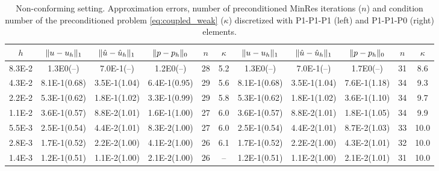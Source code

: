 \documentclass[r]{siamart171218}
\begin{document}
\begin{table}
  \begin{center}
    \scriptsize{
  \begin{tabular}{c|ccc|c|c||ccc|c|c}
    \hline
    $h$ & $\lVert{u-u_h}\rVert_1$ & $\lVert{\hat{u}-\hat{u}_h}\rVert_1$ & $\lVert{p-p_h}\rVert_0$ & $n$ & $\kappa$
        & $\lVert{u-u_h}\rVert_1$ & $\lVert{\hat{u}-\hat{u}_h}\rVert_1$ & $\lVert{p-p_h}\rVert_0$ & $n$ & $\kappa$ \\
    \hline
8.3E-2 & 1.3E0(--)    & 7.0E-1(--)   & 1.2E0(--)    & 28 & 5.2 & 1.3E0(--)    & 7.0E-1(--)   & 1.7E0(--)     & 31 & 8.6\\   
4.3E-2 & 8.1E-1(0.68) & 3.5E-1(1.04) & 6.4E-1(0.95) & 29 & 5.6 & 8.1E-1(0.68) & 3.5E-1(1.04) & 7.6E-1(1.18)  & 34 & 9.3\\ 
2.2E-2 & 5.3E-1(0.62) & 1.8E-1(1.02) & 3.3E-1(0.99) & 29 & 5.8 & 5.3E-1(0.62) & 1.8E-1(1.02) & 3.6E-1(1.10)  & 34 & 9.7\\ 
1.1E-2 & 3.6E-1(0.57) & 8.8E-2(1.01) & 1.6E-1(1.00) & 27 & 6.0 & 3.6E-1(0.57) & 8.8E-2(1.01) & 1.8E-1(1.05)  & 34 & 9.9\\ 
5.5E-3 & 2.5E-1(0.54) & 4.4E-2(1.01) & 8.3E-2(1.00) & 27 & 6.0 & 2.5E-1(0.54) & 4.4E-2(1.01) & 8.7E-2(1.03)  & 33 & 10.0\\
2.8E-3 & 1.7E-1(0.52) & 2.2E-2(1.00) & 4.1E-2(1.00) & 26 & 6.1 & 1.7E-1(0.52) & 2.2E-2(1.00) & 4.3E-2(1.01)  & 32 & 10.0\\
1.4E-3 & 1.2E-1(0.51) & 1.1E-2(1.00) & 2.1E-2(1.00) & 26 & --  & 1.2E-1(0.51) & 1.1E-2(1.00) & 2.1E-2(1.01)  & 31 & 10.0\\
    \hline
  \end{tabular}
    }
    \caption{Non-conforming setting. Approximation errors, number of preconditioned MinRes iterations ($n$) and
      condition number of the preconditioned problem \eqref{eq:coupled_weak} ($\kappa$) discretized
      with P1-P1-P1 (left) and P1-P1-P0 (right) elements.}
  \label{tab:coupled_non}
  \end{center}
\end{table}




\end{document}

